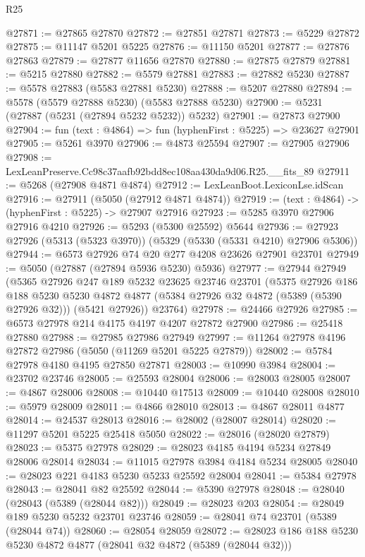 \begin{lexlean}{R25}
\begin{coremodule}
@27871 := @27865 @27870
@27872 := @27851 @27871
@27873 := @5229 @27872
@27875 := @11147 @5201 @5225
@27876 := @11150 @5201
@27877 := @27876 @27863
@27879 := @27877 @11656 @27870
@27880 := @27875 @27879
@27881 := @5215 @27880
@27882 := @5579 @27881
@27883 := @27882 @5230
@27887 := @5578 @27883 (@5583 @27881 @5230)
@27888 := @5207 @27880
@27894 := @5578 (@5579 @27888 @5230) (@5583 @27888 @5230)
@27900 := @5231 (@27887 (@5231 (@27894 @5232 @5232)) @5232)
@27901 := @27873 @27900
@27904 := fun (text : @4864) => fun (hyphenFirst : @5225) => @23627 @27901
@27905 := @5261 @3970
@27906 := @4873 @25594
@27907 := @27905 @27906
@27908 := LexLeanPreserve.Cc98c37aafb92bdd8ec108aa430da9d06.R25.__fits_89
@27911 := @5268 (@27908 @4871 @4874)
@27912 := LexLeanBoot.LexiconLse.idScan
@27916 := @27911 (@5050 (@27912 @4871 @4874))
@27919 := (text : @4864) -> (hyphenFirst : @5225) -> @27907 @27916
@27923 := @5285 @3970 @27906 @27916 @4210
@27926 := @5293 (@5300 @25592) @5644
@27936 := @27923 @27926 (@5313 (@5323 @3970)) (@5329 (@5330 (@5331 @4210) @27906 @5306))
@27944 := @6573 @27926 @74 @20 @277 @4208 @23626 @27901 @23701
@27949 := @5050 (@27887 (@27894 @5936 @5230) @5936)
@27977 := @27944
    @27949
    (@5365
      @27926
      @247
      @189
      @5232
      @23625
      @23746
      @23701
      (@5375
        @27926
        @186
        @188
        @5230
        @5230
        @4872
        @4877
        (@5384 @27926 @32 @4872 (@5389 (@5390 @27926 @32)))
        (@5421 @27926))
      @23764)
@27978 := @24466 @27926
@27985 := @6573 @27978 @214 @4175 @4197 @4207 @27872 @27900
@27986 := @25418 @27880
@27988 := @27985 @27986 @27949
@27997 := @11264 @27978 @4196 @27872 @27986 (@5050 (@11269 @5201 @5225 @27879))
@28002 := @5784 @27978 @4180 @4195 @27850 @27871
@28003 := @10990 @3984
@28004 := @23702 @23746
@28005 := @25593 @28004
@28006 := @28003 @28005
@28007 := @4867 @28006
@28008 := @10440 @17513
@28009 := @10440 @28008
@28010 := @5979 @28009
@28011 := @4866 @28010
@28013 := @4867 @28011 @4877
@28014 := @24537 @28013
@28016 := @28002 (@28007 @28014)
@28020 := @11297 @5201 @5225 @25418 @5050
@28022 := @28016 (@28020 @27879)
@28023 := @5375 @27978
@28029 := @28023 @4185 @4194 @5234 @27849 @28006 @28014
@28034 := @11015 @27978 @3984 @4184 @5234 @28005
@28040 := @28023 @221 @4183 @5230 @5233 @25592 @28004
@28041 := @5384 @27978
@28043 := @28041 @82 @25592
@28044 := @5390 @27978
@28048 := @28040 (@28043 (@5389 (@28044 @82)))
@28049 := @28023 @203
@28054 := @28049 @189 @5230 @5232 @23701 @23746
@28059 := @28041 @74 @23701 (@5389 (@28044 @74))
@28060 := @28054 @28059
@28072 := @28023 @186 @188 @5230 @5230 @4872 @4877 (@28041 @32 @4872 (@5389 (@28044 @32)))

\end{coremodule}
\end{lexlean}
